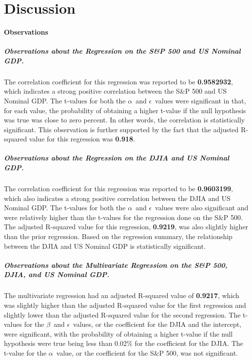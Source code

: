 \documentclass[11pt]{article}
\numberwithin{equation}{section}
\def\alp{\mbox{\boldmath$\alpha$\unboldmath}}
\def\bet{\mbox{\boldmath$\beta$\unboldmath}}
\def\epsi{\mbox{\boldmath$\epsilon$\unboldmath}}
\begin{document}
\section{Discussion}

\paragraph{Observations}
\subparagraph{Observations about the Regression on the S\&P 500 and US Nominal GDP.}
The correlation coefficient for this regression was reported to be \textbf{0.9582932}, which indicates a strong positive correlation between the S\&P 500 and US Nominal GDP. The t-values for both the \alp\, and \epsi\, values were significant in that, for each value, the probability of obtaining a higher t-value if the null hypothesis was true was close to zero percent. In other words, the correlation is statistically significant. This observation is further supported by the fact that the adjusted R-squared value for this regression was \textbf{0.918}.

\subparagraph{Observations about the Regression on the DJIA and US Nominal GDP.}
The correlation coefficient for this regression was reported to be \textbf{0.9603199}, which also indicates a strong positive correlation between the DJIA and US Nominal GDP. The t-values for both the \alp\, and \epsi\, values were also significant and were relatively higher than the t-values for the regression done on the S\&P 500. The adjusted R-squared value for this regression, \textbf{0.9219}, was also slightly higher than the prior regression. Based on the regression summary, the relationship between the DJIA and US Nominal GDP is statistically significant.

\subparagraph{Observations about the Multivariate Regression on the S\&P 500, DJIA, and US Nominal GDP.}
The multivariate regression had an adjusted R-squared value of \textbf{0.9217}, which was slightly higher than the adjusted R-squared value for the first regression and slightly lower than the adjusted R-squared value for the second regression. The t-values for the \bet\, and \epsi\, values, or the coefficient for the DJIA and the intercept, were significant, with the probability of obtaining a higher t-value if the null hypothesis were true being less than 0.02\% for the coefficient for the DJIA. The t-value for the \alp\, value, or the coefficient for the S\&P 500, was not significant. 
\end{document}
